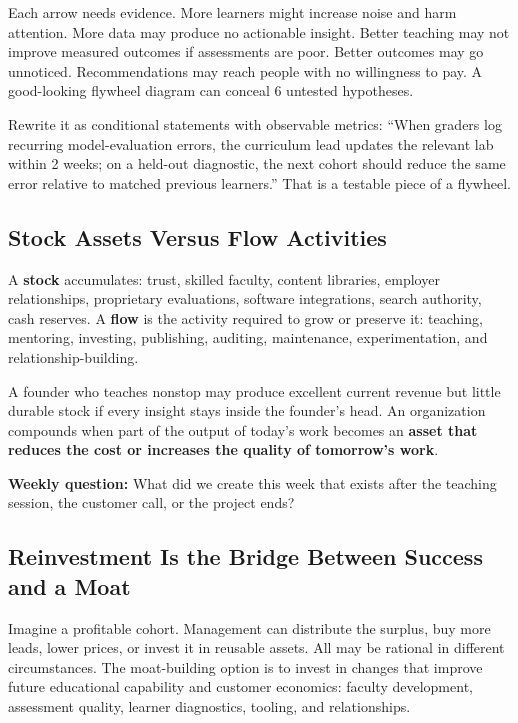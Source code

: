 Each arrow needs evidence. More learners might increase noise and harm attention. More data may produce no actionable insight. Better teaching may not improve measured outcomes if assessments are poor. Better outcomes may go unnoticed. Recommendations may reach people with no willingness to pay. A good-looking flywheel diagram can conceal 6 untested hypotheses.

Rewrite it as conditional statements with observable metrics: ``When graders log recurring model-evaluation errors, the curriculum lead updates the relevant lab within 2 weeks; on a held-out diagnostic, the next cohort should reduce the same error relative to matched previous learners.'' That is a testable piece of a flywheel.

\subsection{Stock Assets Versus Flow Activities}
\label{sec:stock_assets_vs_flow_activities}

A \textbf{stock} accumulates: trust, skilled faculty, content libraries, employer relationships, proprietary evaluations, software integrations, search authority, cash reserves. A \textbf{flow} is the activity required to grow or preserve it: teaching, mentoring, investing, publishing, auditing, maintenance, experimentation, and relationship-building.

A founder who teaches nonstop may produce excellent current revenue but little durable stock if every insight stays inside the founder's head. An organization compounds when part of the output of today's work becomes an \textbf{asset that reduces the cost or increases the quality of tomorrow's work}.

\vspace{0.5em}
\noindent\textbf{Weekly question:} What did we create this week that exists after the teaching session, the customer call, or the project ends?

\subsection{Reinvestment Is the Bridge Between Success and a Moat}
\label{sec:reinvestment_bridge_success_moat}

Imagine a profitable cohort. Management can distribute the surplus, buy more leads, lower prices, or invest it in reusable assets. All may be rational in different circumstances. The moat-building option is to invest in changes that improve future educational capability and customer economics: faculty development, assessment quality, learner diagnostics, tooling, and relationships.

